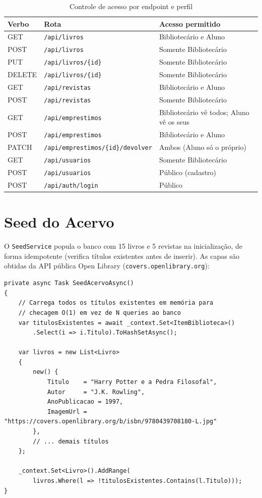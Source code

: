 \documentclass[
  12pt,
  a4paper,
  oneside,
  brazil
]{abntex2}
\begin{document}
\begin{table}[H]
\centering
\caption{Controle de acesso por endpoint e perfil}
\label{tab:acesso}
\begin{tabularx}{\textwidth}{l l L}
\toprule
\textbf{Verbo} & \textbf{Rota} & \textbf{Acesso permitido} \\
\midrule
GET    & \texttt{/api/livros}              & Bibliotecário e Aluno \\
POST   & \texttt{/api/livros}              & Somente Bibliotecário \\
PUT    & \texttt{/api/livros/\{id\}}       & Somente Bibliotecário \\
DELETE & \texttt{/api/livros/\{id\}}       & Somente Bibliotecário \\
GET    & \texttt{/api/revistas}            & Bibliotecário e Aluno \\
POST   & \texttt{/api/revistas}            & Somente Bibliotecário \\
GET    & \texttt{/api/emprestimos}         & Bibliotecário vê todos; Aluno vê os seus \\
POST   & \texttt{/api/emprestimos}         & Bibliotecário e Aluno \\
PATCH  & \texttt{/api/emprestimos/\{id\}/devolver} & Ambos (Aluno só o próprio) \\
GET    & \texttt{/api/usuarios}            & Somente Bibliotecário \\
POST   & \texttt{/api/usuarios}            & Público (cadastro) \\
POST   & \texttt{/api/auth/login}          & Público \\
\bottomrule
\end{tabularx}
\end{table}

\section{Seed do Acervo}

O \texttt{SeedService} popula o banco com 15 livros e 5 revistas na inicialização, de forma idempotente (verifica títulos existentes antes de inserir). As capas são obtidas da API pública Open Library (\texttt{covers.openlibrary.org}):

\begin{lstlisting}[style=csharp, caption={Fragmento do SeedService — verificação idempotente}, label=lst:seed]
private async Task SeedAcervoAsync()
{
    // Carrega todos os títulos existentes em memória para
    // checagem O(1) em vez de N queries ao banco
    var titulosExistentes = await _context.Set<ItemBiblioteca>()
        .Select(i => i.Titulo).ToHashSetAsync();

    var livros = new List<Livro>
    {
        new() {
            Titulo    = "Harry Potter e a Pedra Filosofal",
            Autor     = "J.K. Rowling",
            AnoPublicacao = 1997,
            ImagemUrl = "https://covers.openlibrary.org/b/isbn/9780439708180-L.jpg"
        },
        // ... demais títulos
    };

    _context.Set<Livro>().AddRange(
        livros.Where(l => !titulosExistentes.Contains(l.Titulo)));
}
\end{lstlisting}
\end{document}
